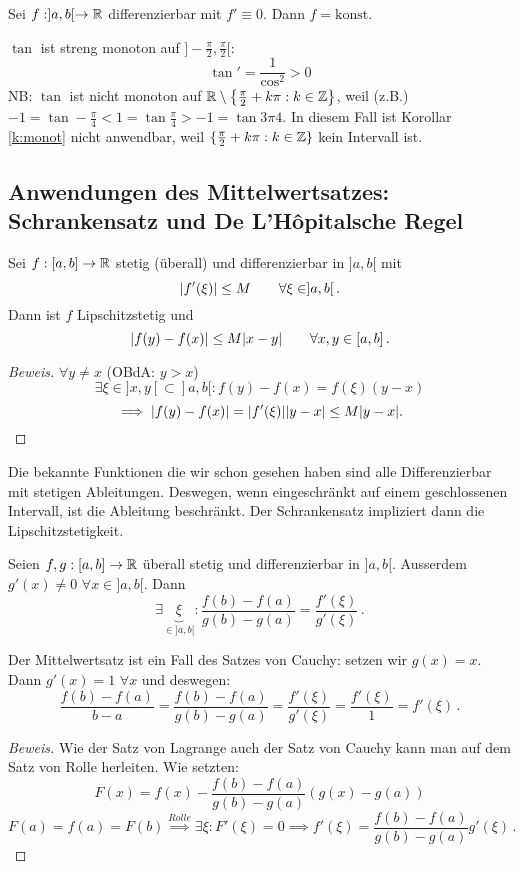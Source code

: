 \begin{Kor}
  Sei $f: ]a,b[\to \mathbb{R}$ differenzierbar mit $f'\equiv 0$. Dann $f=\text{konst}$.
\end{Kor}
\begin{Bsp}\label{b:tan_in}
  $\tan$ ist streng monoton auf $]-\frac{\pi}{2},\frac{\pi}{2}[$:
  \[\tan'=\frac{1}{\cos^2}>0\]
NB: $\tan$ ist nicht monoton auf 
$\mathbb{R}\setminus\left\{ \frac{\pi}{2}+k\pi:k\in\mathbb{Z} \right\}$,
weil (z.B.) $-1 = \tan -\frac{\pi}{4} < 1= \tan \frac{\pi}{4}
> -1 = \tan{3\pi}{4}$. In diesem Fall ist Korollar \ref{k:monot}
nicht anwendbar, weil $\{\frac{\pi}{2}+k\pi:k\in\mathbb{Z}\}$ kein Intervall ist.
\end{Bsp}
\subsection{Anwendungen des Mittelwertsatzes: Schrankensatz und De L'Hôpitalsche Regel}
\begin{Sat}[Schrankensatz]
  Sei $f:[a,b]\to\mathbb{R}$ stetig (überall) und differenzierbar in $]a,b[$ mit
  \[\mathopen| f'(\xi) \mathclose|\leq M\qquad\forall \xi\in ]a,b[\, .\]
  Dann ist $f$ Lipschitzstetig und
  \[\mathopen| f(y)-f(x) \mathclose|\leq M\mathopen| x-y \mathclose|\qquad\forall x,y\in [a,b]\, .\]
\end{Sat}
\begin{proof}[Beweis]
  $\forall y\neq x$ (OBdA: $y>x$)
  \[\exists \xi\in ]x,y[\subset ]a,b[: f(y)-f(x)=f(\xi)(y-x)\]
  \[\implies \mathopen| f(y)-f(x) \mathclose|=\mathopen| f'(\xi) \mathclose|\mathopen| y-x \mathclose|\leq M\mathopen| y-x \mathclose|.\]
\end{proof}

Die bekannte Funktionen die wir schon gesehen haben sind alle
Differenzierbar mit stetigen Ableitungen. Deswegen, wenn eingeschr\"ankt auf
einem geschlossenen Intervall, ist die Ableitung beschr\"ankt. Der Schrankensatz
impliziert dann die Lipschitzstetigkeit.

\begin{Sat}[Cauchy]
  Seien $f,g:[a,b]\to\mathbb{R}$ überall stetig und differenzierbar in $]a,b[$. Ausserdem $g'(x)\neq 0$ $\forall x\in ]a,b[$. Dann
  \[\exists \underbrace{\xi}_{\in ]a,b[}:\frac{f(b)-f(a)}{g(b)-g(a)}=\frac{f'(\xi)}{g'(\xi)}\, .\]
\end{Sat}
\begin{Bem} Der Mittelwertsatz ist ein Fall des Satzes von Cauchy: setzen wir
$g(x)=x$. Dann $g' (x)=1$ $\forall x$ und deswegen:
\[
\frac{f(b)-f(a)}{b-a} = \frac{f(b)-f(a)}{g(b)-g(a)}
= \frac{f'(\xi)}{g'(\xi)} = \frac{f'(\xi)}{1} = f'(\xi)\, .
\]
\end{Bem}
\begin{proof}[Beweis] Wie der Satz von Lagrange auch der 
Satz von Cauchy kann man auf dem Satz von Rolle herleiten. 
Wie setzten: 
  \[F(x)=f(x)-\frac{f(b)-f(a)}{g(b)-g(a)}(g(x)-g(a))\]
  \[F(a)=f(a)=F(b)\stackrel{Rolle}{\implies} 
\exists \xi: F'(\xi)=0\implies f'(\xi) = \frac{f(b)-f(a)}{g(b)-g(a)}g'(\xi)\, .\]
\end{proof}
